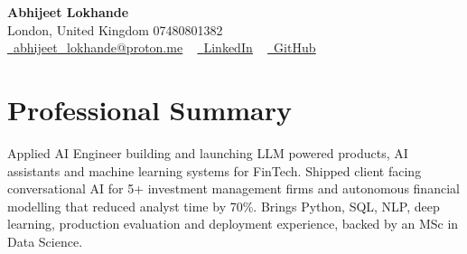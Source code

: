\documentclass[a4paper,10pt]{article}
\begin{document}
    \begin{center}
        {\Huge\bfseries Abhijeet Lokhande}
        \\[2pt] {\color{muted}London, United Kingdom \textbar{} 07480801382}\\
        \small
        \href{mailto:abhijeet_lokhande@proton.me}{\raisebox{-0.2\height}{\color{primary}\faEnvelope}\  \underline{abhijeet\_lokhande@proton.me}} ~
        \href{https://www.linkedin.com/in/ablds/}{\raisebox{-0.2\height}{\color{primary}\faLinkedin}\ \underline{LinkedIn}}  ~
        \href{https://github.com/abhijeetscode}{\raisebox{-0.2\height}{\color{primary}\faGithub}\ \underline{GitHub}}
    \end{center}

\section{Professional Summary}
\vspace{-5pt}
{\color{muted}Applied AI Engineer building and launching LLM powered products, AI assistants and machine learning systems for FinTech. Shipped client facing conversational AI for 5+ investment management firms and autonomous financial modelling that reduced analyst time by 70\%. Brings Python, SQL, NLP, deep learning, production evaluation and deployment experience, backed by an MSc in Data Science.}
\vspace{2pt}

\end{document}

